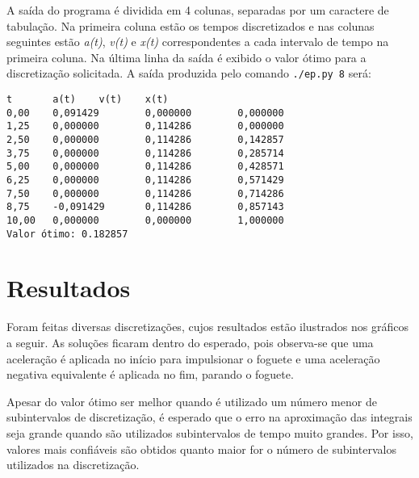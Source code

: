 \documentclass[10pt,oneside,a4paper]{article}
\begin{document}
A saída do programa é dividida em 4 colunas, separadas por um caractere de tabulação. Na primeira coluna estão os tempos discretizados e nas colunas seguintes estão \emph{a(t)}, \emph{v(t)} e \emph{x(t)} correspondentes a cada intervalo de tempo na primeira coluna. Na última linha da saída é exibido o valor ótimo para a discretização solicitada. A saída produzida pelo comando \texttt{./ep.py 8} será:

\begin{verbatim}
t       a(t)    v(t)    x(t)
0,00    0,091429        0,000000        0,000000
1,25    0,000000        0,114286        0,000000
2,50    0,000000        0,114286        0,142857
3,75    0,000000        0,114286        0,285714
5,00    0,000000        0,114286        0,428571
6,25    0,000000        0,114286        0,571429
7,50    0,000000        0,114286        0,714286
8,75    -0,091429       0,114286        0,857143
10,00   0,000000        0,000000        1,000000
Valor ótimo: 0.182857
\end{verbatim}

\section{Resultados}

Foram feitas diversas discretizações, cujos resultados estão ilustrados nos gráficos a seguir. As soluções ficaram dentro do esperado, pois observa-se que uma aceleração é aplicada no início para impulsionar o foguete e uma aceleração negativa equivalente é aplicada no fim, parando o foguete.

Apesar do valor ótimo ser melhor quando é utilizado um número menor de subintervalos de discretização, é esperado que o erro na aproximação das integrais seja grande quando são utilizados subintervalos de tempo muito grandes. Por isso, valores mais confiáveis são obtidos quanto maior for o número de subintervalos utilizados na discretização.

\bigskip
\end{document}
